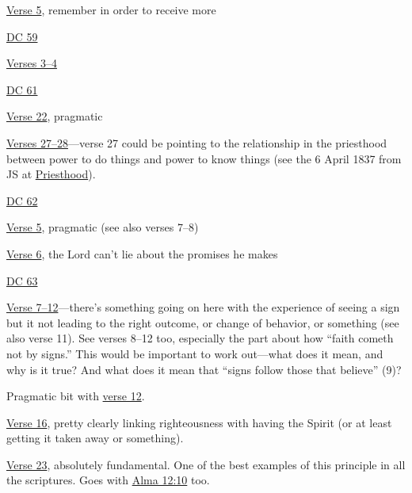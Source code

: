 \begin{compactdesc}
\begin{compactitem}
					\item \hyperref[DC58-5]{Verse 5}, remember in order to receive more
				\end{compactitem}
			\item \hyperref[DC59]{DC 59}
				\begin{compactitem}
					\item \hyperref[DC59-3]{Verses 3--4}
				\end{compactitem}
			\item \hyperref[DC61]{DC 61}
				\begin{compactitem}
					\item \hyperref[DC61-22]{Verse 22}, pragmatic
					\item \hyperref[DC61-27]{Verses 27--28}---verse 27 could be pointing to the relationship in the priesthood between power to do things and power to know things (see the 6 April 1837 from JS at \hyperref[PRIESTHOOD]{Priesthood}). 
				\end{compactitem}
			\item \hyperref[DC62]{DC 62}
				\begin{compactitem}
					\item \hyperref[DC62-5]{Verse 5}, pragmatic (see also verses 7--8)
					\item \hyperref[DC62-6]{Verse 6}, the Lord can't lie about the promises he makes
				\end{compactitem}
			\item \hyperref[DC63]{DC 63}
				\begin{compactitem}
					\item \hyperref[DC63-7]{Verse 7--12}---there's something going on here with the experience of seeing a sign but it not leading to the right outcome, or change of behavior, or something (see also verse 11). See verses 8--12 too, especially the part about how ``faith cometh not by signs.'' This would be important to work out---what does it mean, and why is it true? And what does it mean that ``signs follow those that believe'' (9)?
					\item Pragmatic bit with \hyperref[DC63-12]{verse 12}.
					\item \hyperref[DC63-16]{Verse 16}, pretty clearly linking righteousness with having the Spirit (or at least getting it taken away or something).
					\item \hyperref[DC63-23]{Verse 23}, absolutely fundamental. One of the best examples of this principle in all the scriptures. Goes with \hyperref[ALMA-12-10]{Alma 12:10} too.
						\begin{compactitem}

\end{compactitem}
\end{compactitem}
\end{compactdesc}
